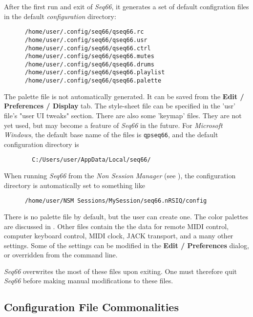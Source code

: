    After the first run and exit of \textsl{Seq66},
   it generates a set of default configration files in the default
   \textsl{configuration} directory:

   \begin{verbatim}
      /home/user/.config/seq66/qseq66.rc
      /home/user/.config/seq66/qseq66.usr
      /home/user/.config/seq66/qseq66.ctrl
      /home/user/.config/seq66/qseq66.mutes
      /home/user/.config/seq66/qseq66.drums
      /home/user/.config/seq66/qseq66.playlist
      /home/user/.config/seq66/qseq66.palette
   \end{verbatim}

   The palette file is not automatically generated.  It can be saved from the
   \textbf{Edit / Preferences / Display} tab.
   The style-sheet file can be specified in the 'usr' file's "user UI tweaks"
   section.
   There are also some 'keymap' files.  They are not yet used, but may become a
   feature of \textsl{Seq66} in the future.
   For \textsl{Microsoft Windows}, the default base name of the files is
   \texttt{qpseq66}, and the default configuration directory is

   \begin{verbatim}
        C:/Users/user/AppData/Local/seq66/
   \end{verbatim}

   When running \textsl{Seq66} from the \textsl{Non Session Manager}
   (see ),
   the configuration directory is automatically set to something like

   \begin{verbatim}
      /home/user/NSM Sessions/MySession/seq66.nRSIQ/config
   \end{verbatim}

   There is no palette file by default, but the user can create one.
   The color palettes are discussed in .
   Other files contain the the data for remote MIDI control, computer keyboard
   control, MIDI clock, JACK transport, and a many other settings.
   Some of the settings can be modified in the \textbf{Edit / Preferences}
   dialog, or overridden from the command line.

   \textsl{Seq66} overwrites the most of these files upon exiting.
   One must therefore quit \textsl{Seq66} before making
   manual modifications to these files.

\subsection{Configuration File Commonalities}
\label{subsec:configuration_file_commonalities}

